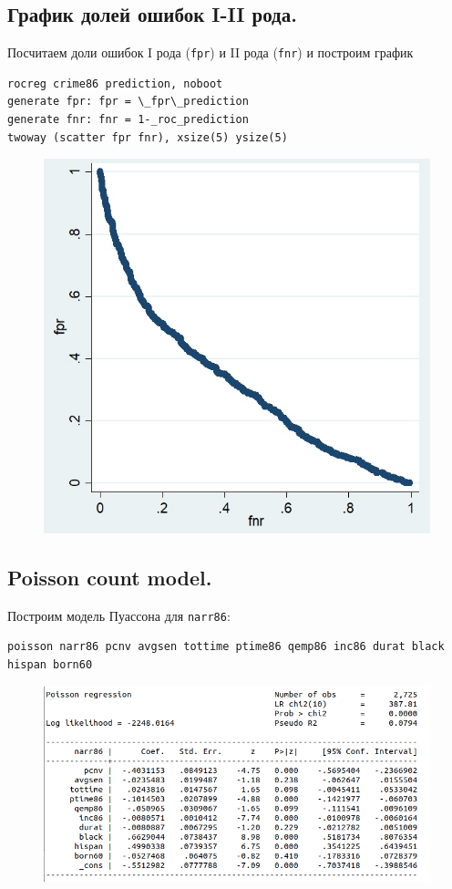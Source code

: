 \documentclass[12pt,a4paper, oneside]{extreport}
\begin{document}
\subsection{График долей ошибок I-II рода.}

Посчитаем доли ошибок I рода (\texttt{fpr}) и II рода (\texttt{fnr}) и построим график 
 
\begin{verbatim}
rocreg crime86 prediction, noboot
generate fpr: fpr = \_fpr\_prediction
generate fnr: fnr = 1-_roc_prediction
twoway (scatter fpr fnr), xsize(5) ysize(5)
\end{verbatim}

\begin{figure}[htb]
	\centering
	\includegraphics[width=0.7\linewidth]{screen}
	\label{fig:screenshot001}
\end{figure}



\subsection{Poisson count model.}


Построим модель Пуассона для \texttt{narr86}: 

\begin{verbatim}
poisson narr86 pcnv avgsen tottime ptime86 qemp86 inc86 durat black hispan born60
\end{verbatim}

\begin{figure}
	\centering
	\includegraphics[width=1\linewidth]{screenshot002}
	\label{fig:screenshot002}
\end{figure}
\end{document}
